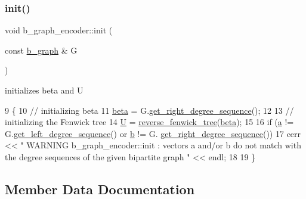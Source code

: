 \mbox{\label{classb__graph__encoder_a9b62ac0580191ac42b98d764046af7cb}} 
\subsubsection{\texorpdfstring{init()}{init()}}
{\footnotesize\ttfamily void b\+\_\+graph\+\_\+encoder\+::init (\begin{DoxyParamCaption}\item[{const \hyperlink{classb__graph}{b\+\_\+graph} \&}]{G }\end{DoxyParamCaption})}



initializes beta and U 


\begin{DoxyCode}
9 \{
10   \textcolor{comment}{// initializing beta}
11   \hyperlink{classb__graph__encoder_ae54d76cc4cee399d98951f870897a144}{beta} = G.\hyperlink{classb__graph_a2711566385b92b02f4c03abdc1f9a582}{get\_right\_degree\_sequence}();
12 
13   \textcolor{comment}{// initializing the Fenwick tree}
14   \hyperlink{classb__graph__encoder_ac810138443002a2b2cf579ced2dc34ce}{U} = \hyperlink{classreverse__fenwick__tree}{reverse\_fenwick\_tree}(\hyperlink{classb__graph__encoder_ae54d76cc4cee399d98951f870897a144}{beta});
15 
16   \textcolor{keywordflow}{if} (\hyperlink{classb__graph__encoder_afd22d167f495cd85b41397f337c377c2}{a} != G.\hyperlink{classb__graph_afd65fb655f7e24217393a10533b87d3c}{get\_left\_degree\_sequence}() or \hyperlink{classb__graph__encoder_a767826e268702e45ab71565e096a52b8}{b} != G.
      \hyperlink{classb__graph_a2711566385b92b02f4c03abdc1f9a582}{get\_right\_degree\_sequence}())
17     cerr << \textcolor{stringliteral}{" WARNING b\_graph\_encoder::init : vectors a and/or b do not match with the degree sequences of
       the given bipartite graph  "} << endl;
18 
19 \}
\end{DoxyCode}


\subsection{Member Data Documentation}
\mbox{\label{classb__graph__encoder_afd22d167f495cd85b41397f337c377c2}} 
